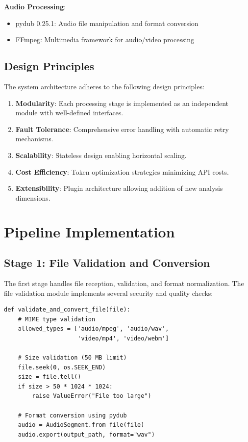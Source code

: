 \documentclass[conference]{IEEEtran}
\begin{document}
\textbf{Audio Processing}:
\begin{itemize}
    \item pydub 0.25.1: Audio file manipulation and format conversion
    \item FFmpeg: Multimedia framework for audio/video processing
\end{itemize}

\subsection{Design Principles}

The system architecture adheres to the following design principles:

\begin{enumerate}
    \item \textbf{Modularity}: Each processing stage is implemented as an independent module with well-defined interfaces.
    \item \textbf{Fault Tolerance}: Comprehensive error handling with automatic retry mechanisms.
    \item \textbf{Scalability}: Stateless design enabling horizontal scaling.
    \item \textbf{Cost Efficiency}: Token optimization strategies minimizing API costs.
    \item \textbf{Extensibility}: Plugin architecture allowing addition of new analysis dimensions.
\end{enumerate}

\section{Pipeline Implementation}

\subsection{Stage 1: File Validation and Conversion}

The first stage handles file reception, validation, and format normalization. The file validation module implements several security and quality checks:

\begin{lstlisting}[caption={File Validation Implementation}]
def validate_and_convert_file(file):
    # MIME type validation
    allowed_types = ['audio/mpeg', 'audio/wav', 
                     'video/mp4', 'video/webm']
    
    # Size validation (50 MB limit)
    file.seek(0, os.SEEK_END)
    size = file.tell()
    if size > 50 * 1024 * 1024:
        raise ValueError("File too large")
    
    # Format conversion using pydub
    audio = AudioSegment.from_file(file)
    audio.export(output_path, format="wav")
\end{lstlisting}
\end{document}
